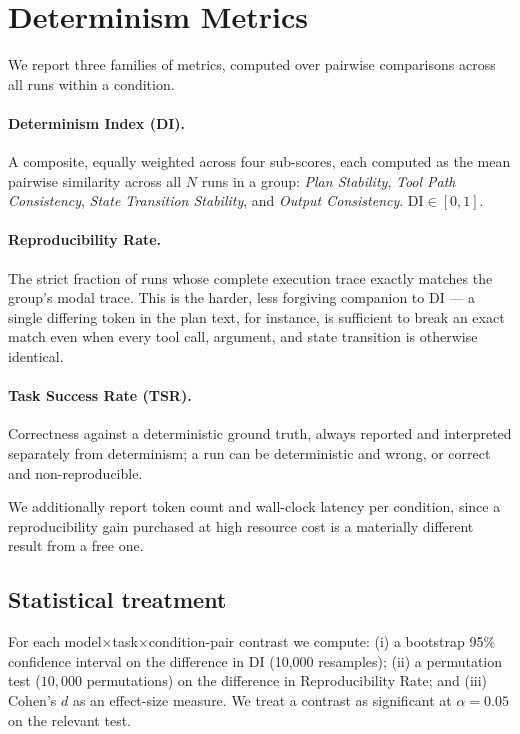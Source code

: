 \documentclass[11pt]{article}
\begin{document}
\section{Determinism Metrics}
\label{sec:metrics}

We report three families of metrics, computed over pairwise comparisons across all runs within a condition.

\paragraph{Determinism Index (DI).} A composite, equally weighted across four sub-scores, each computed as the mean pairwise similarity across all $N$ runs in a group: \emph{Plan Stability}, \emph{Tool Path Consistency}, \emph{State Transition Stability}, and \emph{Output Consistency}. $\mathrm{DI} \in [0,1]$.

\paragraph{Reproducibility Rate.} The strict fraction of runs whose complete execution trace exactly matches the group's modal trace. This is the harder, less forgiving companion to DI --- a single differing token in the plan text, for instance, is sufficient to break an exact match even when every tool call, argument, and state transition is otherwise identical.

\paragraph{Task Success Rate (TSR).} Correctness against a deterministic ground truth, always reported and interpreted separately from determinism; a run can be deterministic and wrong, or correct and non-reproducible.

We additionally report token count and wall-clock latency per condition, since a reproducibility gain purchased at high resource cost is a materially different result from a free one.

\subsection{Statistical treatment}
For each model$\times$task$\times$condition-pair contrast we compute: (i) a bootstrap 95\% confidence interval on the difference in DI (10{,}000 resamples); (ii) a permutation test ($10{,}000$ permutations) on the difference in Reproducibility Rate; and (iii) Cohen's $d$ as an effect-size measure. We treat a contrast as significant at $\alpha = 0.05$ on the relevant test.
\end{document}
